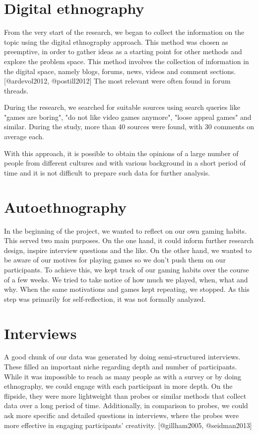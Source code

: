 \documentclass[]{vutinfth}
\begin{document}
\hypertarget{digital-ethnography}{%
\section{Digital ethnography}\label{digital-ethnography}}

From the very start of the research, we began to collect the information
on the topic using the digital ethnography approach. This method was
chosen as preemptive, in order to gather ideas as a starting point for
other methods and explore the problem space. This method involves the
collection of information in the digital space, namely blogs, forums,
news, videos and comment sections. {[}@ardevol2012, @postill2012{]} The
most relevant were often found in forum threads.

During the research, we searched for suitable sources using search
queries like "games are boring", "do not like video games anymore",
"loose appeal games" and similar. During the study, more than 40 sources
were found, with 30 comments on average each.

With this approach, it is possible to obtain the opinions of a large
number of people from different cultures and with various background in
a short period of time and it is not difficult to prepare such data for
further analysis.

\hypertarget{autoethnography}{%
\section{Autoethnography}\label{autoethnography}}

In the beginning of the project, we wanted to reflect on our own gaming
habits. This served two main purposes. On the one hand, it could inform
further research design, inspire interview questions and the like. On
the other hand, we wanted to be aware of our motives for playing games
so we don't push them on our participants. To achieve this, we kept
track of our gaming habits over the course of a few weeks. We tried to
take notice of how much we played, when, what and why. When the same
motivations and games kept repeating, we stopped. As this step was
primarily for self-reflection, it was not formally analyzed.

\hypertarget{interviews}{%
\section{Interviews}\label{interviews}}

A good chunk of our data was generated by doing semi-structured
interviews. These filled an important niche regarding depth and number
of participants. While it was impossible to reach as many people as with
a survey or by doing ethnography, we could engage with each participant
in more depth. On the flipside, they were more lightweight than probes
or similar methods that collect data over a long period of time.
Additionally, in comparison to probes, we could ask more specific and
detailed questions in interviews, where the probes were more effective
in engaging participants' creativity. {[}@gillham2005, @seidman2013{]}
\end{document}
